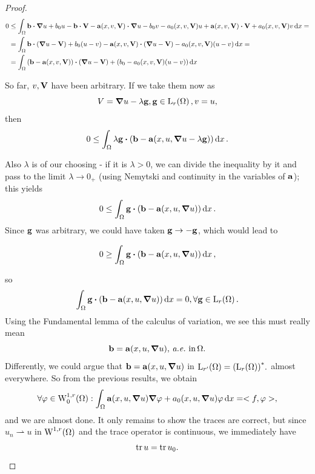 \documentclass{article}
\begin{document}
\begin{proof}
	\begin{align*}
		0 &\leq \int_{\Omega}\vb{b} \vdot \grad u + b_0 u - \vb{b}\vdot \vb{V} - \vb{a}\qty(x,v,\vb{V}) \vdot \grad u - b_0 v - a_0\qty(x,v,\vb{V})u + \vb{a}\qty(x,v,\vb{V})\vdot \vb{V} + a_0\qty(x,v, \vb{V})v \dd{x} = \\
		  & = \int_{\Omega}\vb{b}\vdot\qty(\grad u - \vb{V}) + b_0\qty(u - v) - \vb{a}\qty(x,v,\vb{V})\vdot\qty(\grad u - \vb{V}) - a_0\qty(x, v, \vb{V})\qty(u - v) \dd{x} = \\
		  & = \int_{\Omega}\qty(\vb{b} - \vb{a}\qty(x,v, \vb{V}))\vdot\qty(\grad u - \vb{V}) + \qty(b_0 - a_0\qty(x, v, \vb{V})\qty(u - v))\dd{x}
	\end{align*}

	So far, $v,\vb{V}$ have been arbitrary. If we take them now as
	\[
		V = \grad u - \lambda \vb{g}, \vb{g} \in \LpSet[r]{\Omega}, v = u,
	\]
	then
	\[
		0 \leq \int_{\Omega}\lambda \vb{g} \vdot \qty(\vb{b} - \vb{a}\qty(x, u, \grad u - \lambda \vb{g}))\dd{x}.
	\]

	Also $\lambda$ is of our choosing - if it is $\lambda >0$, we can divide the inequality by it and pass to the limit $\lambda \to 0_+$ (using Nemytski and continuity in the variables of $\vb{a}$); this yields
	\[
		0 \leq \int_{\Omega}\vb{g} \vdot \qty(\vb{b} - \vb{a}\qty(x, u, \grad u))\dd{x}.
	\]
	Since $\vb{g}$ was arbitrary, we could have taken $\vb{g} \to - \vb{g}$, which would lead to


	\[
		0 \geq \int_{\Omega}\vb{g} \vdot\qty(\vb{b} - \vb{a}\qty(x, u, \grad u))\dd{x},
	\]
	 
	so
	\[
		\int_{\Omega}\vb{g} \vdot \qty(\vb{b} - \vb{a}\qty(x, u, \grad u))\dd{x} = 0, \forall \vb{g} \in \LpSet[r]{\Omega}.
	\]
	Using the Fundamental lemma of the calculus of variation, we see this must really mean
	\[
		\vb{b} = \vb{a}\qty(x, u, \grad u), \, \text{\textit{a.e.}} \, \, \text{in} \, \Omega.
	\]
	Differently, we could argue that $\vb{b} = \vb{a}\qty(x, u, \grad u)$ in $\LpSet[r']{\Omega} = \qty(\LpSet[r]{\Omega})^{*}.$
	almost everywhere. So from the previous results, we obtain
	\[
		\forall \varphi \in \WkpzeroSet[1][r]{\Omega}: \int_{\Omega}\vb{a}\qty(x, u, \grad u)\grad \varphi+a_0\qty(x, u, \grad u)\varphi\dd{x} = <f,\varphi>,
	\]
	and we are almost done. It only remains to show the traces are correct, but since $u_n \rightharpoonup u$ in $\WkpSet[1][r]{\Omega}$ and the trace operator is continuous, we immediately have
	\[
		\tr u = \tr u_0.
	\]


\end{proof}
\end{document}
